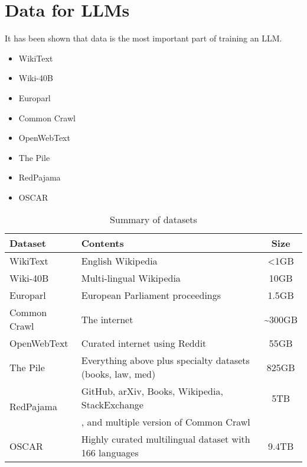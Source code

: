 \section{Data for LLMs}
It has been shown that data is the most important part of training an LLM. 

\begin{itemize}
	\item WikiText
	\item Wiki-40B
	\item Europarl
	\item Common Crawl
	\item OpenWebText
	\item The Pile
	\item RedPajama
	\item OSCAR
\end{itemize}


\begin{table}[h]
	\setlength{\tabcolsep}{4pt}
	\caption{Summary of datasets}
	\centering
	\begin{tabular}{llc}
		\toprule
		Dataset & Contents & Size \\
		\midrule
		WikiText & English Wikipedia & <1GB \\
		Wiki-40B & Multi-lingual Wikipedia & 10GB \\
		Europarl & European Parliament proceedings & 1.5GB \\
		Common Crawl & The internet & \sim 300GB \\
		OpenWebText & Curated internet using Reddit & 55GB \\
		The Pile & Everything above plus specialty datasets (books, law, med) & 825GB \\
		\multirow{2}{*}{RedPajama} & GitHub, arXiv, Books, Wikipedia, StackExchange & 5TB \\
								  &, and multiple version of Common Crawl&\\
		OSCAR & Highly curated multilingual dataset with 166 languages & 9.4TB\\
		\bottomrule
	\end{tabular}
\end{table}












